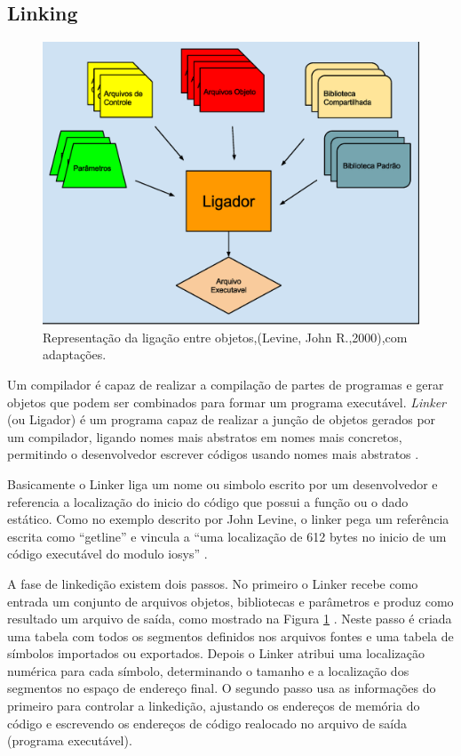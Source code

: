 \subsection{Linking}


\begin{figure}[h]
    \centering
        \includegraphics[keepaspectratio=true,scale=0.6]{figuras/ligador.eps}
    \caption{Representação da ligação entre objetos,(Levine,
											    John R.,2000),com adaptações.}
    \label{fig03}
\end{figure}

Um compilador é capaz de realizar a compilação de partes de programas e gerar
 objetos que podem ser combinados para formar um programa executável. 
\textit{Linker} (ou Ligador) é um programa capaz de realizar a junção 
de objetos gerados por um compilador, ligando nomes mais abstratos em nomes
 mais concretos, permitindo o desenvolvedor escrever códigos usando nomes 
mais abstratos \cite{ref36}.


 Basicamente o Linker liga um nome ou simbolo escrito por um desenvolvedor e
 referencia a localização do inicio do código que possui a função ou o dado
 estático. Como no exemplo descrito por John Levine, o linker pega um 
referência escrita como “getline”  e vincula a “uma localização de 612 bytes 
no inicio de um código executável do modulo iosys” \cite{ref36}. 

A fase de linkedição existem dois passos. No primeiro o Linker recebe como 
entrada um conjunto de arquivos objetos, bibliotecas e parâmetros e produz
 como resultado um arquivo de saída, como mostrado na Figura \ref{fig03}
 \cite{ref37}. Neste passo é criada uma tabela com 
todos os segmentos definidos nos arquivos fontes e uma tabela de símbolos 
importados ou exportados. Depois o Linker atribui uma localização numérica 
para cada símbolo, determinando o tamanho e a localização dos segmentos no
 espaço de endereço final. O segundo passo usa as informações do primeiro
 para controlar a linkedição, ajustando os endereços de memória do código e
 escrevendo os endereços de código realocado no arquivo de saída
 (programa executável).


